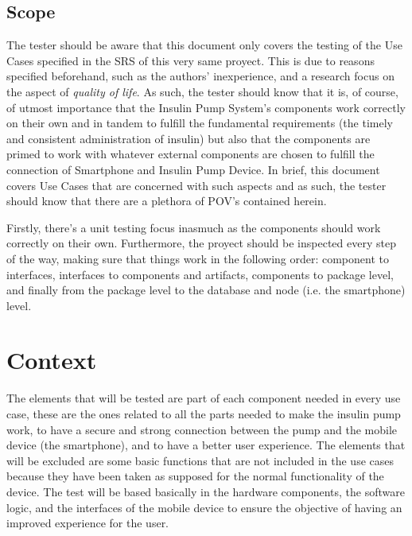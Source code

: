 \documentclass{scrreprt}
\begin{document}
\section{Scope}
The tester should be aware that this document only covers the testing of the Use Cases specified in the SRS of this very same proyect. This is due to reasons specified beforehand, such as the authors' inexperience, 
and a research focus on the aspect of \textsl{quality of life}. As such, the tester should know that it is, of course, of utmost importance that the Insulin Pump System's components work correctly on their own and in
tandem to fulfill the fundamental requirements (the timely and consistent administration of insulin) but also that the components are primed to work with whatever external components are chosen to fulfill the connection
of Smartphone and Insulin Pump Device. In brief, this document covers Use Cases that are concerned with such aspects and as such, the tester should know that there are a plethora of POV's contained herein.

Firstly, there's a unit testing focus inasmuch as the components should work correctly on their own. Furthermore, the proyect should be inspected every step of the way, making sure that things work in the following 
order: component to interfaces, interfaces to components and artifacts, components to package level, and finally from the package level to the database and node (i.e. the smartphone) level.


\chapter{Context}
The elements that will be tested are part of each component needed in every use case, these are the ones related to all the parts needed to make the insulin pump work, to have a secure and strong connection between the 
pump and the mobile device (the smartphone), and to have a better user experience. The elements that will be excluded are some basic functions that are not included in the use cases because they have been taken as 
supposed for the normal functionality of the device. The test will be based basically in the hardware components, the software logic, and the interfaces of the mobile device to ensure the objective of having an improved 
experience for the user.
\end{document}
